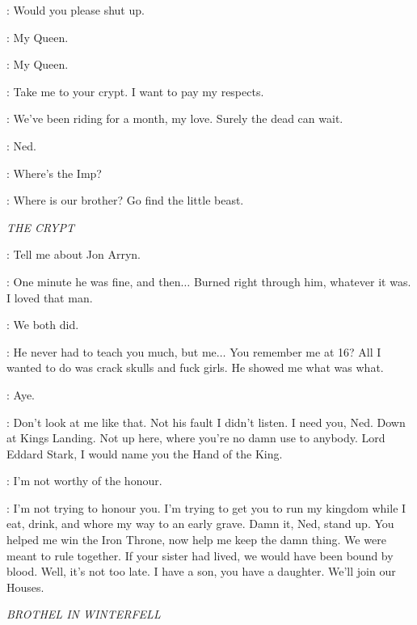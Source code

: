 \SANSA: Would you please shut up. 


\NED: My Queen. 

\CATELYN: My Queen. 

\ROBERT: Take me to your crypt. I want to pay my respects. 

\CERSEI: We've been riding for a month, my love. Surely the dead can wait. 

\ROBERT: Ned. 


\ARYA: Where's the Imp? 


\CERSEI: Where is our brother? Go find the little beast. 


\scene

\textit{THE CRYPT} 


\NED: Tell me about Jon Arryn. 

\ROBERT: One minute he was fine, and then$\ldots$ Burned right through him, whatever it was. I loved that man. 

\NED: We both did. 

\ROBERT: He never had to teach you much, but me$\ldots$ You remember me at 16? All I wanted to do was crack skulls and fuck girls. He showed me what was what. 

\NED: Aye. 

\ROBERT: Don't look at me like that. Not his fault I didn't listen.  I need you, Ned. Down at Kings Landing. Not up here, where you're no damn use to anybody. Lord Eddard Stark, I would name you the Hand of the King. 


\NED: I'm not worthy of the honour. 

\ROBERT: I'm not trying to honour you. I'm trying to get you to run my kingdom while I eat, drink, and whore my way to an early grave. Damn it, Ned, stand up. You helped me win the Iron Throne, now help me keep the damn thing. We were meant to rule together. If your sister had lived, we would have been bound by blood. Well, it's not too late. I have a son, you have a daughter. We'll join our Houses. 


\scene

\textit{BROTHEL IN WINTERFELL} 


